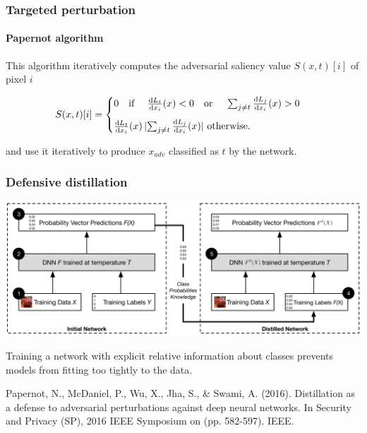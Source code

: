 \documentclass[9pt]{beamer}
\begin{document}
\begin{frame}
  \frametitle{Targeted perturbation}

  \framesubtitle{Papernot algorithm}

  This algorithm iteratively computes the adversarial saliency value
  $S(x, t)[i]$ of pixel $i$

  \medskip

  \[
  S(x, t)[i] =
  \begin{cases}
    0 \text{\quad if \quad} \frac{\mathrm{d} L_{t}}{\mathrm{d} x_{i}}(x) < 0
    \text{\quad or \quad} \sum_{j \neq t} \frac{\mathrm{d} L_{j}}{\mathrm{d} x_{i}}(x)
    > 0 \\[0.3cm]
    \frac{\mathrm{d} L_{t}}{\mathrm{d} x_{i}}(x) \, \lvert \sum_{j \neq
      t} \frac{\mathrm{d} L_{j}}{\mathrm{d} x_{i}}(x) \rvert \text{ otherwise.}
  \end{cases}
  \]

  \medskip

  and use it iteratively to produce $x_{adv}$ classified as $t$ by the
  network.

\end{frame}

\begin{frame}
  \frametitle{Defensive distillation}

  \begin{center}
    \includegraphics[width = 0.9\linewidth]{images/distillation.png}
  \end{center}

  \medskip

  Training a network with explicit relative information about classes
  prevents models from fitting too tightly to the data.

  \medskip

  {\scriptsize Papernot, N., McDaniel, P., Wu, X., Jha, S., \& Swami,
    A. (2016). Distillation as a defense to adversarial perturbations
    against deep neural networks. In Security and Privacy (SP), 2016
    IEEE Symposium on (pp. 582-597). IEEE.}

\end{frame}
\end{document}
